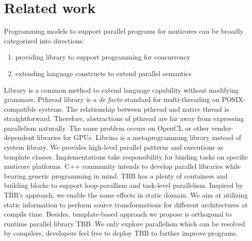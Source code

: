 \section{Related work}\label{sec:related}
Programming models to support parallel programs for muticores can be
broadly categorized into directions:
\begin{enumerate}
\item providing library to support programming for concurrency
\item extending language constructs to extend parallel semantics
\end{enumerate}

Library is a common method to extend language capability
without modifying grammars. Pthread library is a \textit{de facto} standard for
multi-threading on POSIX-compatible systems. The relationship between
pthread and native thread is straightforward. Therefore, abstractions
of pthread are far away from expressing parallelism naturally. The same problem occurs on OpenCL or other vender-dependent
libraries for GPUs. Libvina is a metaprogramming library instead of
system library. We provides high-level parallel patterns
and executions as template classes. Implementations take
responsibility for binding tasks on specific muticore platforms. C++
community intends to develop parallel libraries while bearing generic programming in mind. TBB  has a plenty of
containers and building blocks to support loop-parallism and
task-level parallelism.  Inspired by TBB's approach, we enable the
same effects in static domain. We aim at utilizing static information
to perform source
transformations for different architectures at compile time. Besides, template-based approach we propose is orthogonal to runtime parallel
library TBB. We only explore parallelism which can be resolved by compilers, developers feel free to deploy TBB to
farther improve programs.





